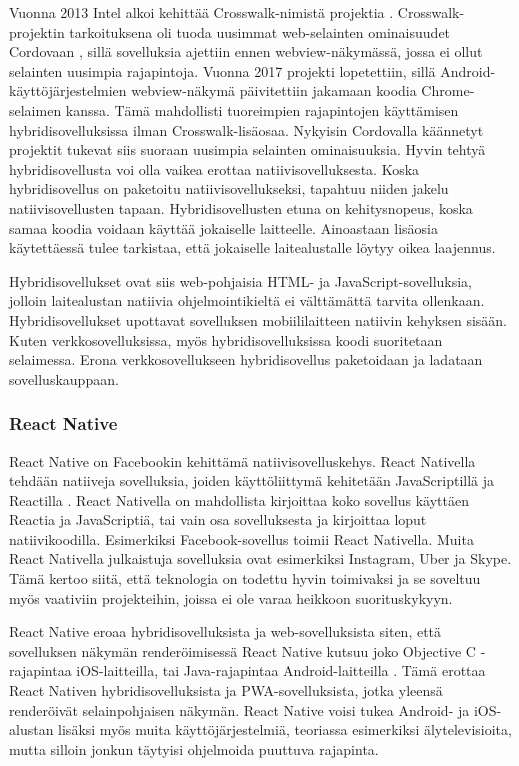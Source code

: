 \documentclass{tktltiki}
\begin{document}
Vuonna 2013 Intel alkoi kehittää Crosswalk-nimistä projektia \cite{Crosswalk}. Crosswalk-projektin tarkoituksena oli tuoda uusimmat web-selainten ominaisuudet Cordovaan \cite{bosnic2016development}, sillä sovelluksia ajettiin ennen webview-näkymässä, jossa ei ollut selainten uusimpia rajapintoja. Vuonna 2017 projekti lopetettiin, sillä Android-käyttöjärjestelmien webview-näkymä päivitettiin jakamaan koodia Chrome-selaimen kanssa. Tämä mahdollisti tuoreimpien rajapintojen käyttämisen hybridisovelluksissa ilman Crosswalk-lisäosaa. Nykyisin Cordovalla käännetyt projektit tukevat siis suoraan uusimpia selainten ominaisuuksia. Hyvin tehtyä hybridisovellusta voi olla vaikea erottaa natiivisovelluksesta. Koska hybridisovellus on paketoitu natiivisovellukseksi, tapahtuu niiden jakelu natiivisovellusten tapaan. Hybridisovellusten etuna on kehitysnopeus, koska samaa koodia voidaan käyttää jokaiselle laitteelle. Ainoastaan lisäosia käytettäessä tulee tarkistaa, että jokaiselle laitealustalle löytyy oikea laajennus. 

Hybridisovellukset ovat siis web-pohjaisia HTML- ja JavaScript-sovelluksia, jolloin laitealustan natiivia ohjelmointikieltä ei välttämättä tarvita ollenkaan. Hybridisovellukset upottavat sovelluksen mobiililaitteen natiivin kehyksen sisään. Kuten verkkosovelluksissa, myös hybridisovelluksissa koodi suoritetaan selaimessa. Erona verkkosovellukseen hybridisovellus paketoidaan ja ladataan sovelluskauppaan. 

\subsubsection{React Native}

React Native on Facebookin kehittämä natiivisovelluskehys. React Nativella tehdään natiiveja sovelluksia, joiden käyttöliittymä kehitetään JavaScriptillä ja Reactilla \cite{Facebook}. React Nativella on mahdollista kirjoittaa koko sovellus käyttäen Reactia ja JavaScriptiä, tai vain osa sovelluksesta ja kirjoittaa loput natiivikoodilla. Esimerkiksi Facebook-sovellus toimii React Nativella. Muita React Nativella julkaistuja sovelluksia ovat esimerkiksi Instagram, Uber ja Skype. Tämä kertoo siitä, että teknologia on todettu hyvin toimivaksi ja se soveltuu myös vaativiin projekteihin, joissa ei ole varaa heikkoon suorituskykyyn.

React Native eroaa hybridisovelluksista ja web-sovelluksista siten, että sovelluksen näkymän renderöimisessä React Native kutsuu joko Objective C -rajapintaa iOS-laitteilla, tai Java-rajapintaa Android-laitteilla \cite{Aggarwal}. Tämä erottaa React Nativen hybridisovelluksista ja PWA-sovelluksista, jotka yleensä renderöivät selainpohjaisen näkymän. React Native voisi tukea Android- ja iOS-alustan lisäksi myös muita käyttöjärjestelmiä, teoriassa esimerkiksi älytelevisioita, mutta silloin jonkun täytyisi ohjelmoida puuttuva rajapinta.
\end{document}
